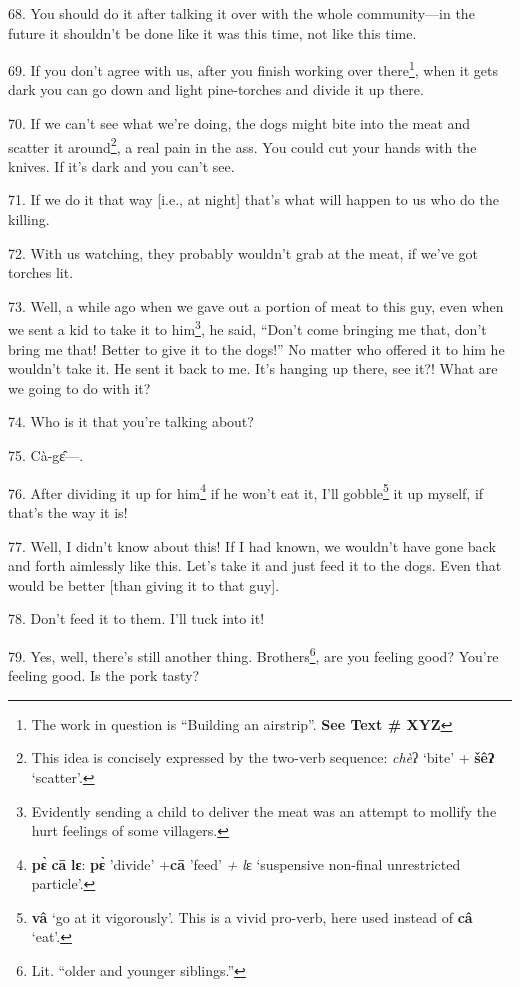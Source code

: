 68. You should do it after talking it over with the whole community---in the future
it shouldn't be done like it was this time, not like this time.

69. If you don't agree with us, after you finish working over there\footnote{The work in question is ``Building an airstrip''. \textbf{See Text \# XYZ}}, when
it gets dark you can go down and light pine-torches and divide it up there.

70. If we can't see what we're doing, the dogs might bite into the meat and scatter
it around\footnote{This idea is concisely expressed by the two-verb sequence:\textit{ chè}ʔ `bite' + \textbf{šêʔ} `scatter'.}, a real pain in the ass. You could cut your hands with the knives.
If it's dark and you can't see.

71. If we do it that way [i.e., at night] that's what will happen to us who do
the killing.

72. With us watching, they probably wouldn't grab at the meat, if we've got torches
lit.

73. Well, a while ago when we gave out a portion of meat to this guy, even when
we sent a kid to take it to him\footnote{Evidently sending a child to deliver the meat was an attempt to mollify the hurt feelings of some villagers.}, he said, ``Don't come bringing me that, don't
bring me that! Better to give it to the dogs!'' No matter who offered it to him
he wouldn't take it. He sent it back to me. It's hanging up there, see it?! What
are we going to do with it?

74. Who is it that you're talking about?

75. Cà-gɛ̂---.

76. After dividing it up for him\footnote{\textbf{pɛ̀} \textbf{cā} \textbf{lɛ}: \textbf{pɛ̀} 'divide' +\textbf{cā} 'feed'\textit{ + l}ɛ `suspensive non-final unrestricted particle'.} if he won't eat it, I'll gobble\footnote{\textbf{vâ} `go at it vigorously'. This is a vivid pro-verb, here used instead of \textbf{câ} `eat'.} it up
myself, if that's the way it is!

77. Well, I didn't know about this! If I had known, we wouldn't have gone back
and forth aimlessly like this. Let's take it and just feed it to the dogs. Even
that would be better [than giving it to that guy].

78. Don't feed it to them. I'll tuck into it!

79. Yes, well, there's still another thing. Brothers\footnote{Lit. ``older and younger siblings.''}, are you feeling good?
You're feeling good. Is the pork tasty?

